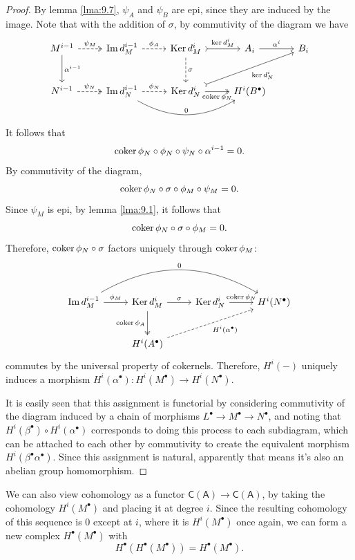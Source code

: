 \begin{proof}
	By lemma \ref{lma:9.7}, $\psi _A$ and $\psi _B$ are epi, since they are induced by the image. Note that with the addition of $\sigma $, by commutivity of the diagram we have
	\[\begin{tikzcd}[row sep = 2.5em, column sep = 2.5em]
		M^{i-1} \ar[r, "\psi_M ", two heads, dashed]\ar[d, "\alpha ^{i-1} "]&\operatorname{Im} d_M^{i-1} \ar[r, "\phi _A", dashed]&\operatorname{Ker} d_M^i\ar[r, "\ker d_M^i", tail]\ar[d, "\sigma ", dashed]&A_i\ar[r, "\alpha ^i"]&B_i\\
		N^{i-1} \ar[r, "\psi _N", two heads, dashed]&\operatorname{Im} d_N^{i-1} \ar[r, "\phi _N", dashed]\ar[rr, bend right, "0"]&\operatorname{Ker} d_N^i\ar[urr, "\ker d_N^i"', tail]\ar[r, "\coker \phi_N"', two heads]&H^i(B^\bullet )
	\end{tikzcd}\]
	It follows that
	\[
		\operatorname{coker} \phi _N \circ \phi _N \circ \psi _N \circ \alpha ^{i-1} =0
	.\]
	By commutivity of the diagram,
	\[
		\operatorname{coker} \phi _N \circ \sigma \circ \phi _M \circ \psi _M=0
	.\]
	Since $\psi _M$ is epi, by lemma \ref{lma:9.1}, it follows that
	\[
		\operatorname{coker} \phi _N \circ \sigma \circ \phi _M=0
	.\]
	Therefore, $\operatorname{coker} \phi _N \circ \sigma $ factors uniquely through $\operatorname{coker} \phi _M$:
	\[\begin{tikzcd}[row sep = 2.5em, column sep = 2.5em]
		\operatorname{Im} d_M^{i-1} \ar[r, "\phi _M"]\ar[rrr, bend left, "0"]&\operatorname{Ker} d_M^{i}\ar[d, two heads, "\coker \phi _A"'] \ar[r, "\sigma "]&\operatorname{Ker} d_N^i\ar[r, "\coker \phi _N"]&H^i(N^\bullet )\\
										     &H^i(A^\bullet )\ar[urr, dashed, "H^i(\alpha ^\bullet )"']
	\end{tikzcd}\]
	commutes by the universal property of cokernels. Therefore, $H^i(-)$ uniquely induces a morphism $H^i(\alpha ^\bullet ): H^i(M^\bullet ) \to H^i(N^\bullet )$.

	It is easily seen that this assignment is functorial by considering commutivity of the diagram induced by a chain of morphisms $L^\bullet \to M^\bullet \to N^\bullet $, and noting that $H^i(\beta ^\bullet )\circ H^i(\alpha ^\bullet )$ corresponds to doing this process to each subdiagram, which can be attached to each other by commutivity to create the equivalent morphism $H^i(\beta ^\bullet \alpha ^\bullet )$. Since this assignment is natural, apparently that means it's also an abelian group homomorphism.
\end{proof}

We can also view cohomology as a functor $\mathsf{C} (\mathsf{A} )\to \mathsf{C} (\mathsf{A} )$, by taking the cohomology $H^i(M^\bullet )$ and placing it at degree $i$. Since the resulting cohomology of this sequence is 0 except at $i$, where it is $H^i(M^\bullet )$ once again, we can form a new complex $H^\bullet (M^\bullet )$ with
\[
	H^\bullet (H^\bullet (M^\bullet ))=H^\bullet (M^\bullet )
.\]
